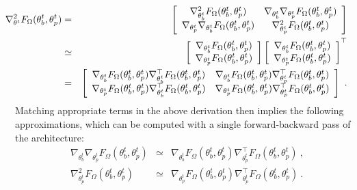 \begin{eqnarray}
\hspace{-8mm}
\nabla^2_{\theta^t} F_{\Omega}(\theta^t_b, \theta^t_p) &=& 
\left[
\begin{array}{cc}
     \nabla^2_{\theta_b^t} F_{\Omega}(\theta^t_b, \theta^t_p) &   \nabla_{\theta_b^t} \nabla_{\theta_p^t} F_{\Omega}(\theta^t_b, \theta^t_p)\\
     \nabla_{\theta_p^t} \nabla_{\theta_b^t} F_{\Omega}(\theta^t_b, \theta^t_p) & \nabla^2_{\theta_p^t} F_{\Omega}(\theta^t_b, \theta^t_p)
\end{array}
\right] \nonumber \\
&\simeq&
\left[
\begin{array}{c}
     \nabla_{\theta_b^t} F_{\Omega}(\theta^t_b, \theta^t_p) \\  \nabla_{\theta_p^t} F_{\Omega}(\theta^t_b, \theta^t_p)
\end{array}
\right]
\left[
\begin{array}{c}
     \nabla_{\theta_b^t} F_{\Omega}(\theta^t_b, \theta^t_p) \\  \nabla_{\theta_p^t} F_{\Omega}(\theta^t_b, \theta^t_p)
\end{array}
\right]^\top \nonumber \\
&=& 
\left[
\begin{array}{cc}
     \nabla_{\theta^t_b} F_{\Omega}(\theta^t_b, \theta^t_p)\nabla^\top_{\theta^t_b} F_{\Omega}(\theta^t_b, \theta^t_p)&   \nabla_{\theta^t_b} F_{\Omega}(\theta^t_b, \theta^t_p)\nabla^\top_{\theta^t_p} F_{\Omega}(\theta^t_b, \theta^t_p)\\
     \nabla_{\theta^t_p} F_{\Omega}(\theta^t_b, \theta^t_p)\nabla^\top_{\theta^t_b} F_{\Omega}(\theta^t_b, \theta^t_p)& \nabla_{\theta^t_p} F_{\Omega}(\theta^t_b, \theta^t_p)\nabla^\top_{\theta^t_p} F_{\Omega}(\theta^t_b, \theta^t_p)
\end{array}
\right] \ .
\end{eqnarray}
Matching appropriate terms in the above derivation then implies the following approximations, which can be computed with a single forward-backward pass of the architecture:
\begin{eqnarray}
\nabla_{\theta_b^t} \nabla_{\theta_p^t} F_{\Omega}(\theta^t_b, \theta^t_p)
&\simeq& \nabla_{\theta^t_b} F_{\Omega}(\theta^t_b, \theta^t_p)\nabla^\top_{\theta^t_p} F_{\Omega}(\theta^t_b, \theta^t_p) \ ,
\\
\nabla^2_{\theta_p^t} F_{\Omega}(\theta^t_b, \theta^t_p) &\simeq& \nabla_{\theta^t_p} F_{\Omega}(\theta^t_b, \theta^t_p)\nabla^\top_{\theta^t_p} F_{\Omega}(\theta^t_b, \theta^t_p) \ .
\end{eqnarray}
